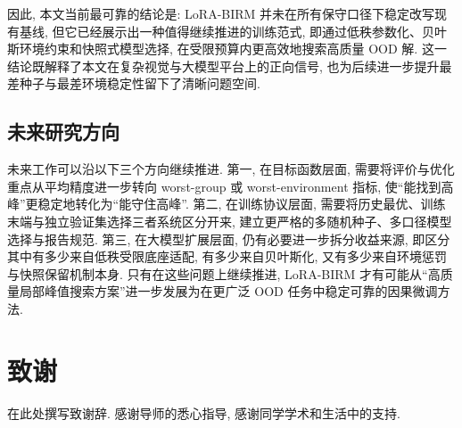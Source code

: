 \documentclass[a4paper,punct=banjiao,twoside]{ctexrep}
\theoremstyle{plain}
\theoremstyle{definition}
\theoremstyle{remark}
\begin{document}
因此, 本文当前最可靠的结论是: LoRA-BIRM 并未在所有保守口径下稳定改写现有基线, 但它已经展示出一种值得继续推进的训练范式, 即通过低秩参数化、贝叶斯环境约束和快照式模型选择, 在受限预算内更高效地搜索高质量 OOD 解. 这一结论既解释了本文在复杂视觉与大模型平台上的正向信号, 也为后续进一步提升最差种子与最差环境稳定性留下了清晰问题空间.

\section{未来研究方向}

未来工作可以沿以下三个方向继续推进. 第一, 在目标函数层面, 需要将评价与优化重点从平均精度进一步转向 worst-group 或 worst-environment 指标, 使“能找到高峰”更稳定地转化为“能守住高峰”. 第二, 在训练协议层面, 需要将历史最优、训练末端与独立验证集选择三者系统区分开来, 建立更严格的多随机种子、多口径模型选择与报告规范. 第三, 在大模型扩展层面, 仍有必要进一步拆分收益来源, 即区分其中有多少来自低秩受限底座适配, 有多少来自贝叶斯化, 又有多少来自环境惩罚与快照保留机制本身. 只有在这些问题上继续推进, LoRA-BIRM 才有可能从“高质量局部峰值搜索方案”进一步发展为在更广泛 OOD 任务中稳定可靠的因果微调方法.

\clearpage
\mbox{}
\thispagestyle{empty}




\clearpage
\mbox{}
\thispagestyle{empty}

\chapter*{致\quad 谢}
\normalsize

在此处撰写致谢辞. 感谢导师的悉心指导, 感谢同学学术和生活中的支持. 
\end{document}
